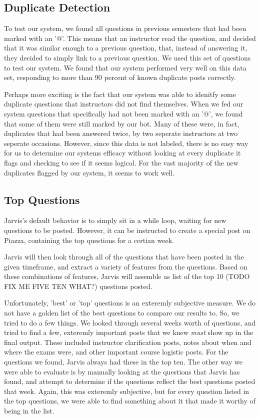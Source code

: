 \documentclass[sigconf]{acmart}
\begin{document}
\subsection{Duplicate Detection}
To test our system, we found all questions in previous semesters that had been marked with an '@'. This means that an instructor read the question, and decided that it was similar enough to a previous question, that, instead of answering it, they decided to simply link to a previous question. We used this set of questions to test our system. We found that our system performed very well on this data set, responding to more than 90 percent of known duplicate posts correctly.

Perhaps more exciting is the fact that our system was able to idenitfy some duplicate questions that instructors did not find themselves. When we fed our system questions that specifically had not been marked with an '@', we found that some of them were still marked by our bot. Many of these were, in fact, duplicates that had been answered twice, by two seperate instructors at two seperate occasions. However, since this data is not labeled, there is no easy way for us to determine our systems efficacy without looking at every duplicate it flags and checking to see if it seems logical. For the vast majority of the new duplicates flagged by our system, it seems to work well.

\subsection{Top Questions}
Jarvis's default behavior is to simply sit in a while loop, waiting for new questions to be posted. However, it can be instructed to create a special post on Piazza, containing the top questions for a certian week.

Jarvis will then look through all of the questions that have been posted in the given timeframe, and extract a variety of features from the questions. Based on these combinations of features, Jarvis will assemble as list of the top 10 (TODO FIX ME FIVE TEN WHAT?) questions posted. 

Unfortunately, 'best' or 'top' questions is an exteremly subjective measure. We do not have a golden list of the best questions to compare our results to. So, we tried to do a few things. We looked through several weeks worth of questions, and tried to find a few, exteremly important posts that we knew \textit{must} show up in the final output. These included instructor clarification posts, notes about when and where the exams were, and other important course logistic posts. For the questions we found, Jarvis always had these in the top ten. The other way we were able to evaluate is by manually looking at the questions that Jarvis has found, and attempt to determine if the questions reflect the best questions posted that week. Again, this was exteremly subjective, but for every question listed in the top questions, we were able to find something about it that made it worthy of being in the list.
\end{document}
